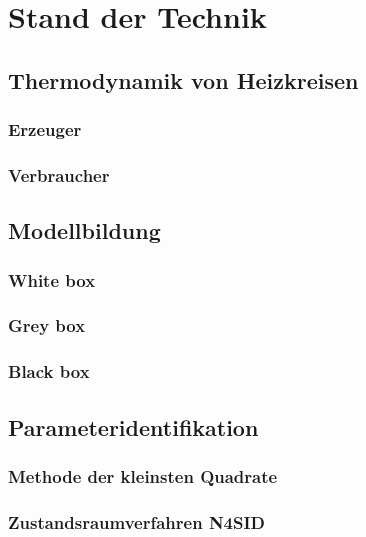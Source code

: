 \section{Stand der Technik}

\subsection{Thermodynamik von Heizkreisen}
\subsubsection{Erzeuger}
\subsubsection{Verbraucher}

\subsection{Modellbildung}
\subsubsection{White box}
\subsubsection{Grey box}
\subsubsection{Black box}

\subsection{Parameteridentifikation}
\subsubsection{Methode der kleinsten Quadrate}
\subsubsection{Zustandsraumverfahren N4SID}